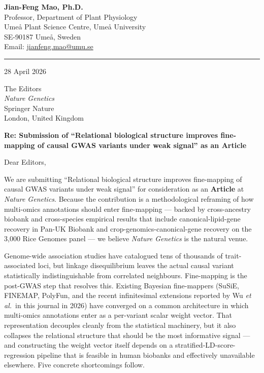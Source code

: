 \documentclass[11pt,a4paper]{article}
\begin{document}

\textbf{Jian-Feng Mao, Ph.D.}\\
Professor, Department of Plant Physiology\\
Ume\aa{} Plant Science Centre, Ume\aa{} University\\
SE-90187 Ume\aa{}, Sweden\\
Email: \href{mailto:jianfeng.mao@umu.se}{jianfeng.mao@umu.se}

\vspace{0.4em}
\noindent\rule{\textwidth}{0.4pt}

\begin{flushright}
28 April 2026
\end{flushright}

\vspace{0.6em}

The Editors\\
\textit{Nature Genetics}\\
Springer Nature\\
London, United Kingdom

\vspace{0.8em}

\textbf{Re: Submission of ``Relational biological structure improves fine-mapping of causal
GWAS variants under weak signal'' as an Article}

\vspace{0.4em}

Dear Editors,

We are submitting ``Relational biological structure improves fine-mapping of causal GWAS
variants under weak signal'' for consideration as an \textbf{Article} at \textit{Nature Genetics}.
Because the contribution is a methodological reframing of how multi-omics annotations should
enter fine-mapping --- backed by cross-ancestry biobank and cross-species empirical results that
include canonical-lipid-gene recovery in Pan-UK Biobank and crop-genomics-canonical-gene
recovery on the 3{,}000 Rice Genomes panel --- we believe \textit{Nature Genetics} is the
natural venue.

Genome-wide association studies have catalogued tens of thousands of trait-associated loci, but
linkage disequilibrium leaves the actual causal variant statistically indistinguishable from
correlated neighbours. Fine-mapping is the post-GWAS step that resolves this. Existing Bayesian
fine-mappers (SuSiE, FINEMAP, PolyFun, and the recent infinitesimal extensions reported by
Wu \emph{et al.}\ in this journal in 2026) have converged on a common architecture in which
multi-omics annotations enter as a per-variant scalar weight vector. That representation
decouples cleanly from the statistical machinery, but it also collapses the relational structure
that should be the most informative signal --- and constructing the weight vector itself depends
on a stratified-LD-score-regression pipeline that is feasible in human biobanks and effectively
unavailable elsewhere. Five concrete shortcomings follow.
\end{document}

